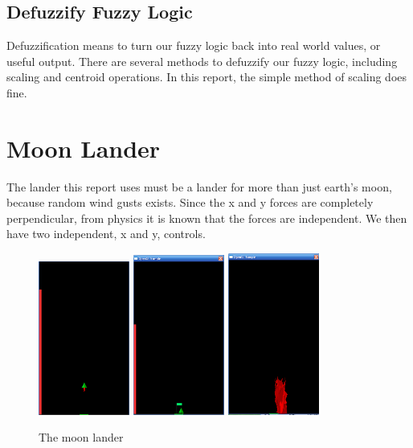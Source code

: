 \documentclass[12pt]{article}
\begin{document}
\subsection{Defuzzify Fuzzy Logic}
Defuzzification means to turn our fuzzy logic back into real world values, or useful output. There are several 
methods to defuzzify our fuzzy logic, including scaling and centroid operations. In this report, the simple 
method of scaling does fine.

\pagebreak

\section{Moon Lander}
The lander this report uses must be a lander for more than just earth's moon, because random wind gusts 
exists. Since the x and y forces are completely perpendicular, from physics it is known that the forces are
independent. We then have two independent, x and y, controls.

\begin{figure}[h!]
        \begin{center}
                \includegraphics[width=30mm]{report_images/simple_flight.png}
                \includegraphics[width=30mm]{report_images/simple_landing.png}
                \includegraphics[width=30mm]{report_images/crash.png}
                \caption{The moon lander}
                \label{simple}
        \end{center}
\end{figure}
\end{document}
